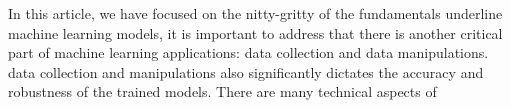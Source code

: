 In this article, we have focused on the nitty-gritty of the fundamentals underline machine learning models, it is important to address that there is another critical part of machine learning applications: data collection and data manipulations. data collection and manipulations also significantly dictates the accuracy and robustness of the trained models. There are many technical aspects of 